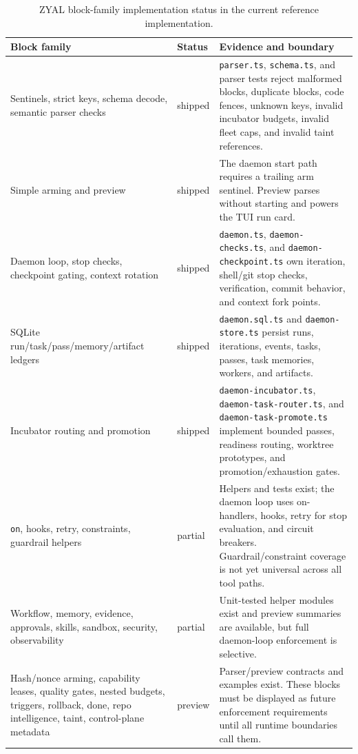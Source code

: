 \documentclass[conference]{IEEEtran}
\newcommand{\ZYAL}{ZYAL}
\newcommand{\status}[1]{\textsf{\footnotesize #1}}
\newcommand{\shipped}{\status{shipped}}
\newcommand{\partialstatus}{\status{partial}}
\newcommand{\preview}{\status{preview}}
\begin{document}
\begin{table}[t]
\centering
\caption{\ZYAL{} block-family implementation status in the current reference implementation.}
\label{tab:coverage}
\footnotesize
\begin{tabularx}{\textwidth}{p{29mm}p{16mm}X}
\toprule
Block family & Status & Evidence and boundary \\
\midrule
Sentinels, strict keys, schema decode, semantic parser checks & \shipped & \texttt{parser.ts}, \texttt{schema.ts}, and parser tests reject malformed blocks, duplicate blocks, code fences, unknown keys, invalid incubator budgets, invalid fleet caps, and invalid taint references. \\
\midrule
Simple arming and preview & \shipped & The daemon start path requires a trailing arm sentinel. Preview parses without starting and powers the TUI run card. \\
\midrule
Daemon loop, stop checks, checkpoint gating, context rotation & \shipped & \texttt{daemon.ts}, \texttt{daemon-checks.ts}, and \texttt{daemon-checkpoint.ts} own iteration, shell/git stop checks, verification, commit behavior, and context fork points. \\
\midrule
SQLite run/task/pass/memory/artifact ledgers & \shipped & \texttt{daemon.sql.ts} and \texttt{daemon-store.ts} persist runs, iterations, events, tasks, passes, task memories, workers, and artifacts. \\
\midrule
Incubator routing and promotion & \shipped & \texttt{daemon-incubator.ts}, \texttt{daemon-task-router.ts}, and \texttt{daemon-task-promote.ts} implement bounded passes, readiness routing, worktree prototypes, and promotion/exhaustion gates. \\
\midrule
\texttt{on}, hooks, retry, constraints, guardrail helpers & \partialstatus & Helpers and tests exist; the daemon loop uses on-handlers, hooks, retry for stop evaluation, and circuit breakers. Guardrail/constraint coverage is not yet universal across all tool paths. \\
\midrule
Workflow, memory, evidence, approvals, skills, sandbox, security, observability & \partialstatus & Unit-tested helper modules exist and preview summaries are available, but full daemon-loop enforcement is selective. \\
\midrule
Hash/nonce arming, capability leases, quality gates, nested budgets, triggers, rollback, done, repo intelligence, taint, control-plane metadata & \preview & Parser/preview contracts and examples exist. These blocks must be displayed as future enforcement requirements until all runtime boundaries call them. \\
\bottomrule
\end{tabularx}
\end{table}
\end{document}
